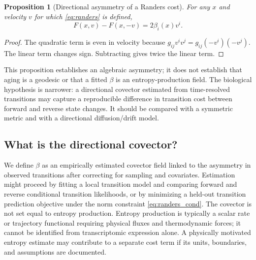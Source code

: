\documentclass[11pt,a4paper]{article}
\newtheorem{proposition}{Proposition}[section]
\theoremstyle{definition}
\theoremstyle{remark}
\begin{document}
\begin{proposition}[Directional asymmetry of a Randers cost]
For any $x$ and velocity $v$ for which \cref{eq:randers} is defined,
\begin{equation}
F(x,v)-F(x,-v)=2\beta_i(x)v^i.
\end{equation}
\end{proposition}
\begin{proof}
The quadratic term is even in velocity because $g_{ij}v^iv^j=g_{ij}(-v^i)(-v^j)$. The linear term changes sign. Subtracting gives twice the linear term.\end{proof}

This proposition establishes an algebraic asymmetry; it does not establish that aging is a geodesic or that a fitted $\beta$ is an entropy-production field. The biological hypothesis is narrower: a directional covector estimated from time-resolved transitions may capture a reproducible difference in transition cost between forward and reverse state changes. It should be compared with a symmetric metric and with a directional diffusion/drift model.

\subsection{What is the directional covector?}
We define $\beta$ as an empirically estimated covector field linked to the asymmetry in observed transitions after correcting for sampling and covariates. Estimation might proceed by fitting a local transition model and comparing forward and reverse conditional transition likelihoods, or by minimizing a held-out transition prediction objective under the norm constraint \cref{eq:randers_cond}. The covector is not set equal to entropy production. Entropy production is typically a scalar rate or trajectory functional requiring physical fluxes and thermodynamic forces; it cannot be identified from transcriptomic expression alone. A physically motivated entropy estimate may contribute to a separate cost term if its units, boundaries, and assumptions are documented.
\end{document}
